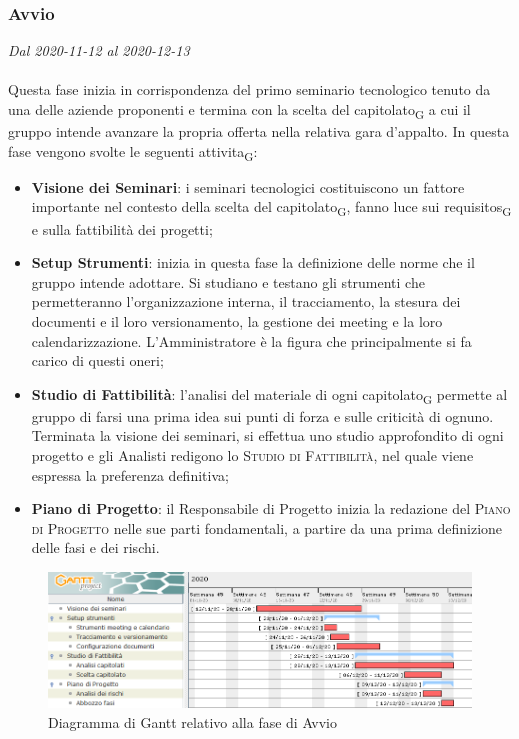 \subsubsection{Avvio}

\textit{Dal 2020-11-12 al 2020-12-13}
\\\\
Questa fase inizia in corrispondenza del primo seminario tecnologico tenuto da una delle aziende proponenti e termina con la scelta del \gls{capitolato}\textsubscript{G} a cui il gruppo intende avanzare la propria offerta nella relativa gara d'appalto.
In questa fase vengono svolte le seguenti \gls{attivita}\textsubscript{G}:
\begin{itemize}
	\item \textbf{Visione dei Seminari}: i seminari tecnologici costituiscono un fattore importante nel contesto della scelta del \gls{capitolato}\textsubscript{G}, fanno luce sui \glspl{requisito}\textsubscript{G} e sulla fattibilità dei progetti;
	\item \textbf{Setup Strumenti}: inizia in questa fase la definizione delle norme che il gruppo intende adottare. Si studiano e testano gli strumenti che permetteranno l'organizzazione interna, il tracciamento, la stesura dei documenti e il loro versionamento, la gestione dei meeting e la loro calendarizzazione. L'Amministratore è la figura che principalmente si fa carico di questi oneri;
	\item \textbf{Studio di Fattibilità}: l'analisi del materiale di ogni \gls{capitolato}\textsubscript{G} permette al gruppo di farsi una prima idea sui punti di forza e sulle criticità di ognuno. Terminata la visione dei seminari, si effettua uno studio approfondito di ogni progetto e gli Analisti redigono lo \textsc{Studio di Fattibilità}, nel quale viene espressa la preferenza definitiva;
	\item \textbf{Piano di Progetto}: il Responsabile di Progetto inizia la redazione del \textsc{Piano di Progetto} nelle sue parti fondamentali, a partire da una prima definizione delle fasi e dei rischi.
\end{itemize}  


\begin{figure}[H]
	\centering
	\includegraphics[scale=0.62]{res/images/01_gantt_avvio.png}
	\caption{Diagramma di Gantt relativo alla fase di Avvio}
\end{figure}




